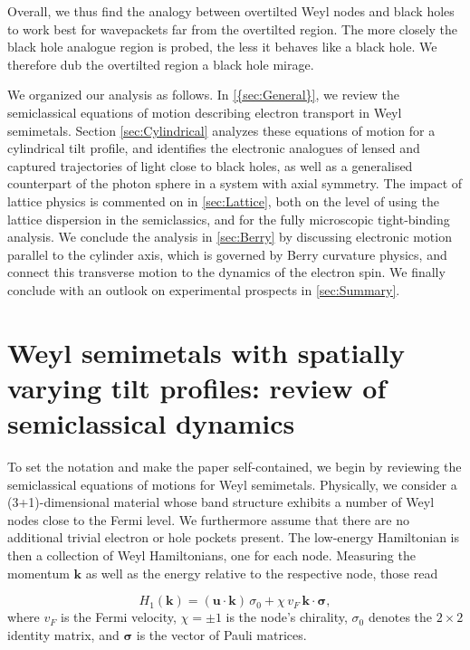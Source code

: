 \documentclass[submission, Phys]{SciPost}
\begin{document}
Overall, we thus find the analogy between overtilted Weyl nodes and black holes to work best for wavepackets far from the overtilted region. The more closely the black hole analogue region is probed, the less it behaves like a black hole. We therefore dub the overtilted region a black hole mirage.

We organized our analysis as follows. In \cref{{sec:General}}, we review the semiclassical equations of motion describing electron transport in Weyl semimetals. Section \ref{sec:Cylindrical} analyzes these equations of motion for a cylindrical tilt profile, and identifies the electronic analogues of lensed and captured trajectories of light close to black holes, as well as a generalised counterpart of the photon sphere in a system with axial symmetry. The impact of lattice physics is commented on in \cref{sec:Lattice}, both on the level of using the lattice dispersion in the semiclassics, and for the fully microscopic tight-binding analysis. We conclude the analysis in \cref{sec:Berry} by discussing electronic motion parallel to the cylinder axis, which is governed by Berry curvature physics, and connect this transverse motion to the dynamics of the electron spin. We finally conclude with an outlook on experimental prospects in \cref{sec:Summary}.




\section{Weyl semimetals with spatially varying tilt profiles: review of semiclassical dynamics}
\label{sec:General}
To set the notation and make the paper self-contained, we begin by reviewing the semiclassical equations of motions for Weyl semimetals. Physically, we consider a (3+1)-dimensional material whose band structure exhibits a number of Weyl nodes close to the Fermi level. We furthermore assume that there are no additional trivial electron or hole pockets present. The low-energy Hamiltonian is then a collection of Weyl Hamiltonians, one for each node. Measuring the momentum $\bm{k}$ as well as the energy relative to the respective node, those read

\begin{equation}
    H_1(\bm k) = (\bm{u} \cdot \bm{k})\,\sigma_0  + \chi \,v_F\,\bm{k} \cdot \bm{\sigma},
    \label{Eq:WeylHam}
\end{equation}
%
where $v_F$ is the Fermi velocity, $\chi= \pm1$ is the node's chirality, $\sigma_0$ denotes the $2\times2$ identity matrix, and $\bm{\sigma}$ is the vector of Pauli matrices. 
 
\end{document}
